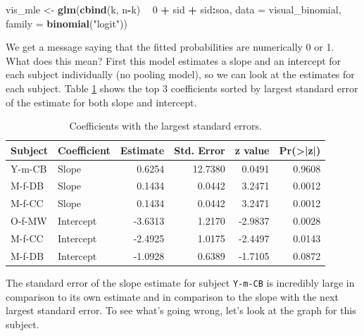 \documentclass[11pt, oneside, openany]{scrbook}
\newenvironment{Shaded}{\begin{snugshade}}{\end{snugshade}}
\newcommand{\DataTypeTok}[1]{\textcolor[rgb]{0.13,0.29,0.53}{#1}}
\newcommand{\DecValTok}[1]{\textcolor[rgb]{0.00,0.00,0.81}{#1}}
\newcommand{\KeywordTok}[1]{\textcolor[rgb]{0.13,0.29,0.53}{\textbf{#1}}}
\newcommand{\NormalTok}[1]{#1}
\newcommand{\OperatorTok}[1]{\textcolor[rgb]{0.81,0.36,0.00}{\textbf{#1}}}
\newcommand{\StringTok}[1]{\textcolor[rgb]{0.31,0.60,0.02}{#1}}
\begin{document}
\begin{Shaded}
\begin{Highlighting}[]
\NormalTok{vis_mle <-}\StringTok{ }\KeywordTok{glm}\NormalTok{(}\KeywordTok{cbind}\NormalTok{(k, n}\OperatorTok{-}\NormalTok{k) }\OperatorTok{~}\StringTok{ }\DecValTok{0} \OperatorTok{+}\StringTok{ }\NormalTok{sid }\OperatorTok{+}\StringTok{ }\NormalTok{sid}\OperatorTok{:}\NormalTok{soa,}
               \DataTypeTok{data =}\NormalTok{ visual_binomial, }\DataTypeTok{family =} \KeywordTok{binomial}\NormalTok{(}\StringTok{"logit"}\NormalTok{))}
\end{Highlighting}
\end{Shaded}

We get a message saying that the fitted probabilities are numerically 0 or 1. What does this mean? First this model estimates a slope and an intercept for each subject individually (no pooling model), so we can look at the estimates for each subject. Table \ref{tab:ch043-Intensive-Oyster} shows the top 3 coefficients sorted by largest standard error of the estimate for both slope and intercept.

\begin{table}[!h]

\caption{\label{tab:ch043-Intensive-Oyster}Coefficients with the largest standard errors.}
\centering
\begin{tabular}[t]{llrrrr}
\toprule
Subject & Coefficient & Estimate & Std. Error & z value & Pr(>|z|)\\
\midrule
Y-m-CB & Slope & 0.6254 & 12.7380 & 0.0491 & 0.9608\\
M-f-DB & Slope & 0.1434 & 0.0442 & 3.2471 & 0.0012\\
M-f-CC & Slope & 0.1434 & 0.0442 & 3.2471 & 0.0012\\
O-f-MW & Intercept & -3.6313 & 1.2170 & -2.9837 & 0.0028\\
M-f-CC & Intercept & -2.4925 & 1.0175 & -2.4497 & 0.0143\\
\addlinespace
M-f-DB & Intercept & -1.0928 & 0.6389 & -1.7105 & 0.0872\\
\bottomrule
\end{tabular}
\end{table}

The standard error of the slope estimate for subject \texttt{Y-m-CB} is incredibly large in comparison to its own estimate and in comparison to the slope with the next largest standard error. To see what's going wrong, let's look at the graph for this subject.
\end{document}

